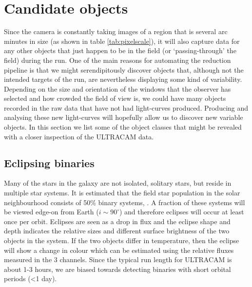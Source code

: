 \section{Candidate objects}
Since the camera is constantly taking images of a region that is several arc minutes in size (as shown in table \ref{tab:pixelscale}), it will also capture data for any other objects that just happen to be in the field (or `passing-through' the field) during the run. One of the main reasons for automating the reduction pipeline is that we might serendipitously discover objects that, although not the intended targets of the run, are nevertheless displaying some kind of variability. Depending on the size and orientation of the windows that the observer has selected and how crowded the field of view is, we could have many objects recorded in the raw data that have not had light-curves produced. Producing and analysing these new light-curves will hopefully allow us to discover new variable objects.  In this section we list some of the object classes that might be revealed with a closer inspection of the ULTRACAM data.

\subsection{Eclipsing binaries}
Many of the stars in the galaxy are not isolated, solitary stars, but reside in multiple star systems. It is estimated that the field star population in the solar neighbourhood consists of 50\% binary systems, \citep{binaryfraction}. A fraction of these systems will be viewed edge-on from Earth ($i \sim 90^\circ$) and therefore eclipses will occur at least once per orbit. Eclipses are seen as a drop in flux and the eclipse shape and depth indicates the relative sizes and different surface brightness of the two objects in the system. If the two objects differ in temperature, then the eclipse will show a change in colour which can be estimated using the relative fluxes measured in the 3 channels. Since the typical run length for ULTRACAM is about 1-3 hours, we are biased towards detecting binaries with short orbital periods (\textless 1 day). 

